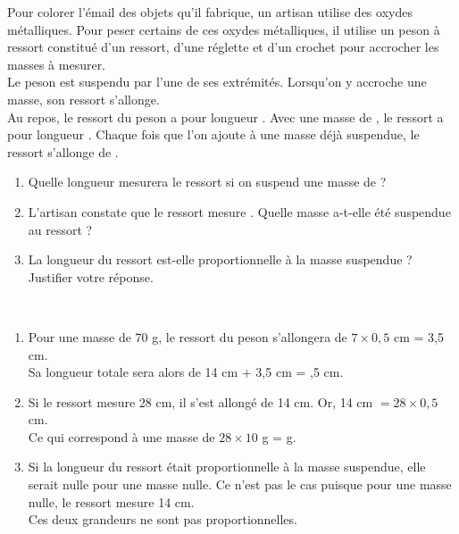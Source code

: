 \begin{exercice}[CRPE 2015 G3] %
   Pour colorer l'émail des objets qu'il fabrique, un artisan utilise des oxydes métalliques. Pour peser certains de ces oxydes métalliques, il utilise un peson à ressort constitué d'un ressort, d'une réglette et d'un crochet pour accrocher les masses à mesurer. \\
   Le peson est suspendu par l'une de ses extrémités. Lorsqu'on y accroche une masse, son ressort s'allonge. \\
   Au repos, le ressort du peson a pour longueur . Avec une masse de , le ressort a pour longueur . Chaque fois que l'on ajoute  à une masse déjà suspendue, le ressort s'allonge de .
   \begin{enumerate}
      \item Quelle longueur mesurera le ressort si on suspend une masse de  ?
      \item L'artisan constate que le ressort mesure . Quelle masse a-t-elle été suspendue au ressort ?
      \item La longueur du ressort est-elle proportionnelle à la masse suspendue ? Justifier votre réponse.
   \end{enumerate} 
\end{exercice}

\begin{corrige}
\ \\ [-5mm]
   \begin{enumerate}
      \item Pour une masse de 70 g, le ressort du peson s'allongera de $7\times0,5$ cm = 3,5 cm. \\
         Sa longueur totale sera alors de 14 cm + 3,5 cm = {,5 cm.}
      \item Si le ressort mesure 28 cm, il s'est allongé de 14 cm. Or, 14 cm $=28\times0,5$ cm. \\
         Ce qui correspond à une masse de  $28\times10$ g = { g.}
      \item Si la longueur du ressort était proportionnelle à la masse suspendue, elle serait nulle pour une masse nulle. Ce n'est pas le cas puisque pour une masse nulle, le ressort mesure 14 cm. \\
         {\blue Ces deux grandeurs ne sont pas proportionnelles.}
   \end{enumerate}
\end{corrige}

\bigskip


